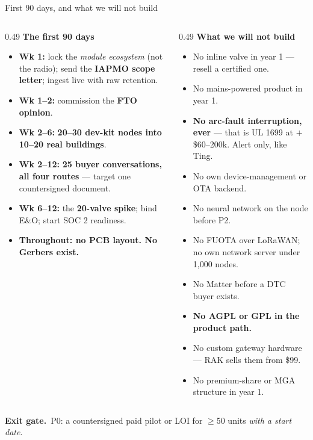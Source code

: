 \documentclass[aspectratio=169,t,10pt,xcolor={table,svgnames}]{beamer}
\newcommand{\gate}[1]{%
  \begin{beamercolorbox}[wd=\textwidth,sep=1.6ex]{}%
    \color{ink}\small\textbf{Exit gate.}\, #1%
  \end{beamercolorbox}}
\begin{document}
\begin{frame}{First 90 days, and what we will not build}
  \begin{columns}[t]
  \begin{column}{0.49\textwidth}
    {\footnotesize\textbf{The first 90 days}}
    \begin{itemize}\scriptsize
      \item \textbf{Wk 1:} lock the \emph{module ecosystem} (not the radio); send the \textbf{IAPMO
            scope letter}; ingest live with raw retention.
      \item \textbf{Wk 1--2:} commission the \textbf{FTO opinion}.
      \item \textbf{Wk 2--6:} \textbf{20--30 dev-kit nodes into 10--20 real buildings}.
      \item \textbf{Wk 2--12:} \textbf{25 buyer conversations, all four routes} --- target one
            countersigned document.
      \item \textbf{Wk 6--12:} the \textbf{20-valve spike}; bind E\&O; start SOC 2 readiness.
      \item \textbf{Throughout: no PCB layout. No Gerbers exist.}
    \end{itemize}
  \end{column}
  \begin{column}{0.49\textwidth}
    {\footnotesize\textbf{What we will not build}}
    \begin{itemize}\scriptsize
      \item No inline valve in year 1 --- resell a certified one.
      \item No mains-powered product in year 1.
      \item \textbf{No arc-fault interruption, ever} --- that is UL 1699 at $+$\$60--200k. Alert
            only, like Ting.
      \item No own device-management or OTA backend.
      \item No neural network on the node before P2.
      \item No FUOTA over LoRaWAN; no own network server under 1{,}000 nodes.
      \item No Matter before a DTC buyer exists.
      \item \textbf{No AGPL or GPL in the product path.}
      \item No custom gateway hardware --- RAK sells them from \$99.
      \item No premium-share or MGA structure in year 1.
    \end{itemize}
  \end{column}
  \end{columns}
  \vspace{0.3em}
  \gate{P0: a countersigned paid pilot or LOI for $\geq$50 units \emph{with a start date}.}
\end{frame}
\end{document}
